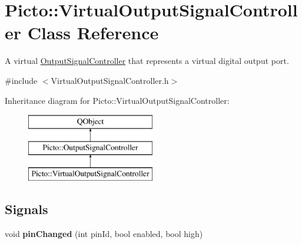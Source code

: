 \hypertarget{class_picto_1_1_virtual_output_signal_controller}{\section{Picto\-:\-:Virtual\-Output\-Signal\-Controller Class Reference}
\label{class_picto_1_1_virtual_output_signal_controller}
}


A virtual \hyperlink{class_picto_1_1_output_signal_controller}{Output\-Signal\-Controller} that represents a virtual digital output port.  




{\ttfamily \#include $<$Virtual\-Output\-Signal\-Controller.\-h$>$}

Inheritance diagram for Picto\-:\-:Virtual\-Output\-Signal\-Controller\-:\begin{figure}[H]
\begin{center}
\leavevmode
\includegraphics[height=3.000000cm]{class_picto_1_1_virtual_output_signal_controller}
\end{center}
\end{figure}
\subsection*{Signals}
\begin{DoxyCompactItemize}
\item 
\hypertarget{class_picto_1_1_virtual_output_signal_controller_afcdf53713175913f3c4421a909421b89}{void {\bfseries pin\-Changed} (int pin\-Id, bool enabled, bool high)}\label{class_picto_1_1_virtual_output_signal_controller_afcdf53713175913f3c4421a909421b89}

\end{DoxyCompactItemize}
